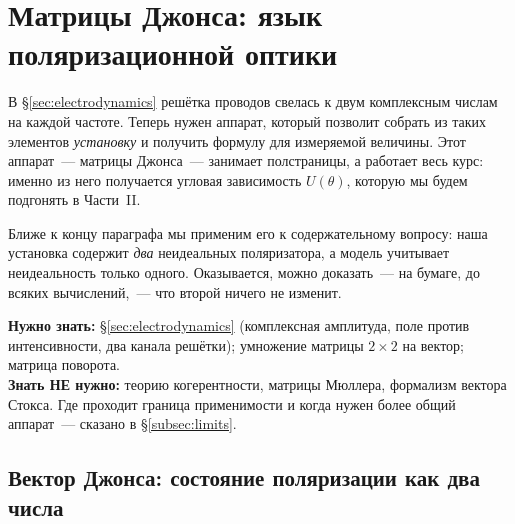 %
%
\section{Матрицы Джонса: язык поляризационной оптики}
\label{sec:jones}

В §\ref{sec:electrodynamics} решётка проводов свелась к двум комплексным числам на каждой частоте.
Теперь нужен аппарат, который позволит собрать из таких элементов \emph{установку} и получить
формулу для измеряемой величины. Этот аппарат~--- матрицы Джонса~--- занимает полстраницы, а
работает весь курс: именно из него получается угловая зависимость $U(\theta)$, которую мы будем
подгонять в Части~II.

Ближе к концу параграфа мы применим его к содержательному вопросу: наша установка содержит
\emph{два} неидеальных поляризатора, а модель учитывает неидеальность только одного. Оказывается,
можно доказать~--- на бумаге, до всяких вычислений,~--- что второй ничего не изменит.

\begin{tcolorbox}[enhanced,colback=cPanel,colframe=cGrid,boxrule=0.8pt,arc=2pt,
                  title={\bfseries\color{cAccent} Пререквизиты},coltitle=cAccent,
                  attach boxed title to top left={xshift=6pt,yshift=-2pt},
                  boxed title style={colback=cPanel,boxrule=0pt,arc=0pt},top=10pt]
\textbf{Нужно знать:} §\ref{sec:electrodynamics} (комплексная амплитуда, поле против
интенсивности, два канала решётки); умножение матрицы $2\times2$ на вектор; матрица
поворота.\\[0.3em]
\textbf{Знать НЕ нужно:} теорию когерентности, матрицы Мюллера, формализм вектора Стокса. Где
проходит граница применимости и когда нужен более общий аппарат~--- сказано в §\ref{subsec:limits}.
\end{tcolorbox}

\subsection{Вектор Джонса: состояние поляризации как два числа}

